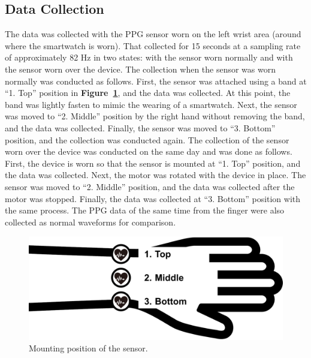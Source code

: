 \documentclass[sigconf]{acmart}
\newcommand\figref[1]{\textbf{Figure~\ref{fig:#1}}}
\begin{document}
\subsection{Data Collection}
The data was collected with the PPG sensor worn on the left wrist area (around where the smartwatch is worn). That collected for 15 seconds at a sampling rate of approximately 82 Hz in two states: with the sensor worn normally and with the sensor worn over the device. The collection when the sensor was worn normally was conducted as follows. First, the sensor was attached using a band at ``1. Top'' position in \figref{position}, and the data was collected. At this point, the band was lightly fasten to mimic the wearing of a smartwatch. Next, the sensor was moved to ``2. Middle'' position by the right hand without removing the band, and the data was collected. Finally, the sensor was moved to ``3. Bottom'' position, and the collection was conducted again. The collection of the sensor worn over the device was conducted on the same day and was done as follows. First, the device is worn so that the sensor is mounted at ``1. Top'' position, and the data was collected. Next, the motor was rotated with the device in place. The sensor was moved to ``2. Middle'' position, and the data was collected after the motor was stopped. Finally, the data was collected at ``3. Bottom'' position with the same process. The PPG data of the same time from the finger were also collected as normal waveforms for comparison.

\begin{figure}[!t]
  \centering
  \includegraphics[width=0.7\linewidth]{figures/position.eps}
  \caption{Mounting position of the sensor.}
  \label{fig:position}
\end{figure}
\end{document}
